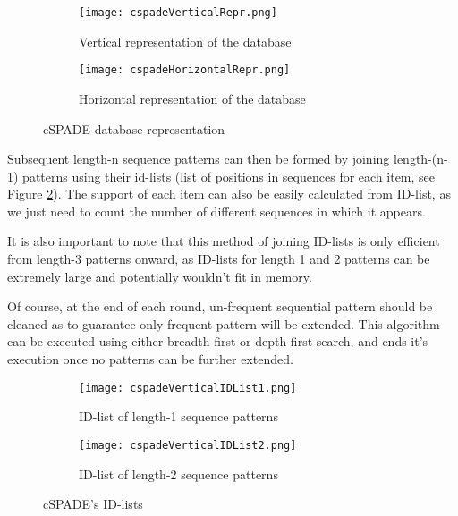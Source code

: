 \documentclass{eplmastersthesis}
\begin{document}
\begin{figure}[h]
  \centering
  \begin{subfigure}[t]{0.4\textwidth}
  	\centering
  	\texttt{[image: cspadeVerticalRepr.png]}
    \caption{Vertical representation of the database}
  \end{subfigure}
  \begin{subfigure}[t]{0.59\textwidth}
  	\centering
    \texttt{[image: cspadeHorizontalRepr.png]}
    \caption{Horizontal representation of the database}
  \end{subfigure}
  \caption{cSPADE database representation}
  \label{ex:cspadeDatabaseRepr}
\end{figure}

Subsequent length-n sequence patterns can then be formed by joining length-(n-1) patterns using their id-lists (list of positions in sequences for each item, see Figure \ref{fig:cspadeIDList}). The support of each item can also be easily calculated from ID-list, as we just need to count the number of different sequences in which it appears.  \newline

It is also important to note that this method of joining ID-lists is only efficient from length-3 patterns onward, as ID-lists for length 1 and 2 patterns can be extremely large and potentially wouldn't fit in memory. \newline

Of course, at the end of each round, un-frequent sequential pattern should be cleaned as to guarantee only frequent pattern will be extended. This algorithm can be executed using either breadth first or depth first search, and ends it's execution once no patterns can be further extended.

\begin{figure}[h]
  \centering
  \begin{subfigure}[t]{0.54\textwidth}
  	\centering
  	\texttt{[image: cspadeVerticalIDList1.png]}
    \caption{ID-list of length-1 sequence patterns}
  \end{subfigure}
  \begin{subfigure}[t]{0.45\textwidth}
  	\centering
    \texttt{[image: cspadeVerticalIDList2.png]}
    \caption{ID-list of length-2 sequence patterns}
  \end{subfigure}
  \caption{cSPADE's ID-lists}
  \label{fig:cspadeIDList}
\end{figure}
\end{document}
